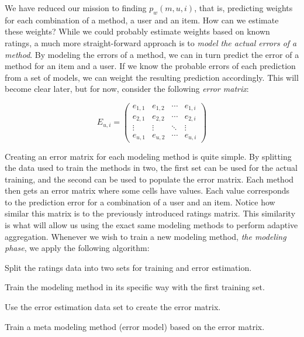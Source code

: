 We have reduced our mission to finding $p_{w}(m,u,i)$,
that is, predicting weights for each combination of a method, a user and an item.
How can we estimate these weights?
While we could probably estimate weights based on known ratings,
a much more straight-forward approach is to \emph{model the actual errors of a method}.
By modeling the errors of a method, we can in turn predict the error
of a method for an item and a user. 
If we know the probable errors of each prediction from a set of models,
we can weight the resulting prediction accordingly.
This will become clear later, but for now,
consider the following \emph{error matrix}:

\begin{equation*}
 E_{u,i} =
 \begin{pmatrix}
    e_{1,1} & e_{1,2} & \cdots & e_{1,i} \\
    e_{2,1} & e_{2,2} & \cdots & e_{2,i} \\
    \vdots  & \vdots  & \ddots & \vdots  \\
    e_{u,1} & e_{u,2} & \cdots & e_{u,i}
 \end{pmatrix}
\end{equation*}

Creating an error matrix for each modeling method is quite simple.
By splitting the data used to train the methods in two,
the first set can be used for the actual training, and the second
can be used to populate the error matrix.
Each method then gets an error matrix where some cells have values.
Each value corresponds to the prediction error for a combination of a user and an item.
Notice how similar this matrix is to the previously introduced ratings matrix.
This similarity is what will allow us using the exact same modeling methods
to perform adaptive aggregation.
Whenever we wish to train a new modeling method,
\emph{the modeling phase}, we apply the following algorithm:

\begin{enumerate*}
  \item Split the ratings data into two sets for training and error estimation.
  \item Train the modeling method in its specific way with the first training set.
  \item Use the error estimation data set to create the error matrix.
  \item Train a meta modeling method (error model) based on the error matrix.
\end{enumerate*}

